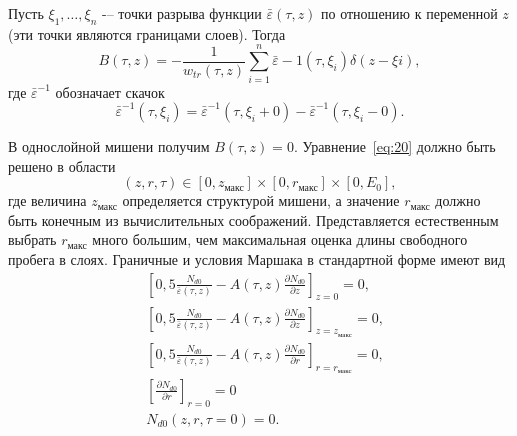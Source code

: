 Пусть \(\xi_1,\ldots,\xi_n\) -– точки разрыва функции \(\bar{\varepsilon}(\tau , z)\) по отношению к переменной \( z \) (эти точки являются границами слоев). Тогда
\begin{equation}
B(\tau, z) = −\frac{1}{w_{tr}(\tau, z)}\sum_{i=1}^{n} \bar{\varepsilon} −1 (\tau ,\xi_i ) \delta ( z − \xi i ) ,    
\end{equation}
где \(\bar{\varepsilon}^{−1}\) обозначает скачок
\begin{equation}
    \bar{\varepsilon}^{−1} (\tau ,\xi_i ) = \bar{\varepsilon}^{−1} (\tau,\xi_i + 0 ) − \bar{\varepsilon}^{−1} (\tau ,\xi_i − 0 ).
\end{equation}

В однослойной мишени получим \( B(\tau,z)=0 \).
Уравнение~\ref{eq:20} должно быть решено в области
\begin{equation}
    (z, r,\tau) \in [0, z_\text{макс}]\times [0, r_\text{макс} ]\times[0, E_0],    
\end{equation}
где величина \( z_\text{макс} \) определяется структурой мишени, а значение \( r_\text{макс} \) должно быть
конечным из вычислительных соображений. Представляется естественным выбрать \( r_\text{макс} \)
много большим, чем максимальная оценка длины свободного пробега в слоях.
Граничные и условия Маршака в стандартной форме \cite{keiz} имеют вид
\begin{align}
& \left[0,5 \frac{N_{d0}}{\bar{\varepsilon}(\tau, z)} − A (\tau , z)\frac{\partial N_{d0}}{\partial z}\right]_{z=0} = 0 ,\\
& \left[0,5 \frac{N_{d0}}{\bar{\varepsilon}(\tau, z)} − A (\tau , z)\frac{\partial N_{d0}}{\partial z}\right]_{z=z_\text{макс}} = 0 ,\\
& \left[0,5 \frac{N_{d0}}{\bar{\varepsilon}(\tau, z)} − A (\tau , z)\frac{\partial N_{d0}}{\partial r}\right]_{r=r_\text{макс}} = 0,\\
& \left[\frac{\partial N_{d0}}{\partial r}\right]_{r=0} = 0\\
& N_{d0}(z, r, \tau=0 ) = 0.
\end{align}

